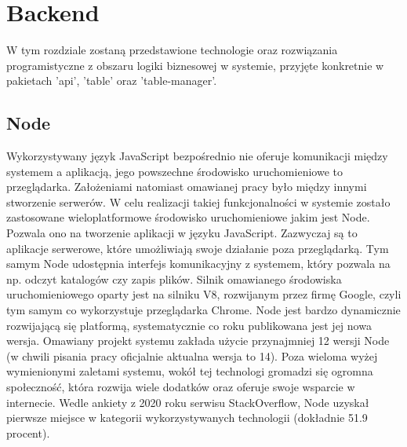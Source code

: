 \chapter{Backend}
\label{ch:backend}
W tym rozdziale zostaną przedstawione technologie oraz rozwiązania programistyczne z obszaru logiki biznesowej w systemie, przyjęte konkretnie w pakietach 'api', 'table' oraz 'table-manager'.

\label{section:node}
\section{Node}

Wykorzystywany język JavaScript bezpośrednio nie oferuje komunikacji między systemem a aplikacją, jego powszechne środowisko uruchomieniowe to przeglądarka. Założeniami natomiast omawianej pracy było między innymi stworzenie serwerów. W celu realizacji takiej funkcjonalności w systemie zostało zastosowane wieloplatformowe środowisko uruchomieniowe jakim jest Node. Pozwala ono na tworzenie aplikacji w języku JavaScript. Zazwyczaj są to aplikacje serwerowe, które umożliwiają swoje działanie poza przeglądarką. Tym samym Node udostępnia interfejs komunikacyjny z systemem, który pozwala na np. odczyt katalogów czy  zapis plików. Silnik omawianego środowiska uruchomieniowego oparty jest na silniku V8, rozwijanym przez firmę Google, czyli tym samym co wykorzystuje przeglądarka Chrome. Node jest bardzo dynamicznie rozwijającą się platformą, systematycznie co roku publikowana jest jej nowa wersja. Omawiany projekt systemu zakłada użycie przynajmniej 12 wersji Node (w chwili pisania pracy oficjalnie aktualna wersja to 14). Poza wieloma wyżej wymienionymi zaletami systemu, wokół tej technologi gromadzi się ogromna społeczność, która rozwija wiele dodatków oraz oferuje swoje wsparcie w internecie. Wedle ankiety z 2020 roku serwisu StackOverflow, Node uzyskał pierwsze miejsce w kategorii wykorzystywanych technologii (dokładnie 51.9 procent).\cite{StackOverflowSurvey, ExpressDocs}

